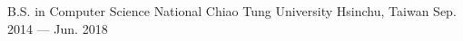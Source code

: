 

\begin{cventries}

  \cventry
    {B.S. in Computer Science } %
    {National Chiao Tung University} %
    {Hsinchu, Taiwan} %
    {Sep. 2014 --- Jun. 2018} %
    {}

\end{cventries}
